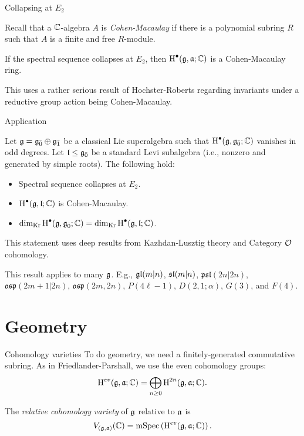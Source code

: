 \documentclass[handout]{beamer}
\begin{document}
\begin{frame}{Collapsing at $E_2$}\pause
  \begin{definition}
    Recall that a $\CC$-algebra $A$ is \emph{Cohen-Macaulay} if there is a polynomial subring $R$ such that $A$ is a finite and free $R$-module.
  \end{definition}
  \pause
  \begin{theorem}
   If the spectral sequence collapses at $E_2$, then $\H^\bullet(\g,\a;\CC)$ is a Cohen-Macaulay ring.
  \end{theorem}
 \pause
   This uses a rather serious result of Hochster-Roberts regarding invariants under a reductive group action being Cohen-Macaulay.
\end{frame}

\begin{frame}{Application}\pause
  \begin{theorem}
    Let $\g = \even{\g} \oplus \odd{\g}$ be a classical Lie superalgebra such that $\H^\bullet(\g,\even{\g};\CC)$ vanishes in odd degrees. Let $\l \leq \even{\g}$ be a standard Levi subalgebra (i.e., nonzero and generated by simple roots). The following hold:
    \begin{itemize}
    \pause\item Spectral sequence collapses at $E_2$.
    \pause\item $\H^\bullet(\g,\l;\CC)$ is Cohen-Macaulay.
    \pause\item $\kdim \H^\bullet(\g,\even{\g};\CC) = \kdim \H^\bullet(\g,\l;\CC)$.
    \end{itemize}
  \end{theorem}
  
  \pause This statement uses deep results from Kazhdan-Lusztig theory and Category $\O$ cohomology.

  \pause
\begin{example}
  This result applies to many $\g$. E.g., $\gl(m|n)$, $\sl(m|n)$, $\mathfrak{psl}(2n|2n)$, $\mathfrak{osp}(2m+1|2n)$, $\mathfrak{osp}(2m,2n)$, $P(4\ell - 1)$, $D(2,1;\alpha)$, $G(3)$, and $F(4)$.
\end{example}
\end{frame}

\section{Geometry}

\begin{frame}{Cohomology varieties} \pause
  To do geometry, we need a finitely-generated commutative subring. As in Friedlander-Parshall, we use the even cohomology groups:
  \[
    \H^{ev}(\g,\a;\CC) = \bigoplus_{n \geq 0} \H^{2n}(\g,\a;\CC).
  \]
  \pause
  \begin{definition}
    The \emph{relative cohomology variety} of $\g$ relative to $\a$ is
    \[
      V_{(\g,\a)}(\CC) = \maxspec\left(\H^{ev}(\g,\a;\CC)\right).
    \]
    
  \end{definition}
\end{frame}
\end{document}
